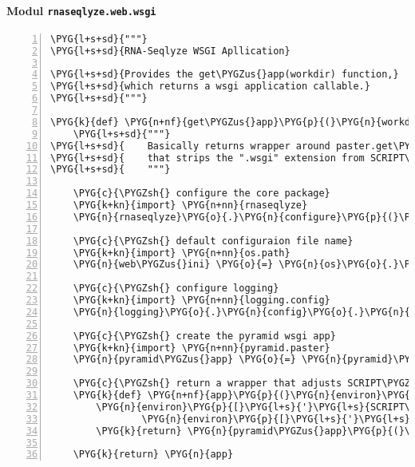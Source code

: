 \paragraph{Modul \texttt{rnaseqlyze.web.wsgi}}
\label{rnaseqlyze-pdf:modul-rnaseqlyze-web-wsgi}
\begin{Verbatim}[commandchars=\\\{\},numbers=left,firstnumber=1,stepnumber=5]
\PYG{l+s+sd}{"""}
\PYG{l+s+sd}{RNA-Seqlyze WSGI Apllication}

\PYG{l+s+sd}{Provides the get\PYGZus{}app(workdir) function,}
\PYG{l+s+sd}{which returns a wsgi application callable.}
\PYG{l+s+sd}{"""}

\PYG{k}{def} \PYG{n+nf}{get\PYGZus{}app}\PYG{p}{(}\PYG{n}{workdir}\PYG{p}{)}\PYG{p}{:}
    \PYG{l+s+sd}{"""}
\PYG{l+s+sd}{    Basically returns wrapper around paster.get\PYGZus{}app}
\PYG{l+s+sd}{    that strips the ".wsgi" extension from SCRIPT\PYGZus{}NAME}
\PYG{l+s+sd}{    """}

    \PYG{c}{\PYGZsh{} configure the core package}
    \PYG{k+kn}{import} \PYG{n+nn}{rnaseqlyze}
    \PYG{n}{rnaseqlyze}\PYG{o}{.}\PYG{n}{configure}\PYG{p}{(}\PYG{n}{workdir}\PYG{p}{)}

    \PYG{c}{\PYGZsh{} default configuraion file name}
    \PYG{k+kn}{import} \PYG{n+nn}{os.path}
    \PYG{n}{web\PYGZus{}ini} \PYG{o}{=} \PYG{n}{os}\PYG{o}{.}\PYG{n}{path}\PYG{o}{.}\PYG{n}{join}\PYG{p}{(}\PYG{n}{workdir}\PYG{p}{,} \PYG{l+s}{'}\PYG{l+s}{web.ini}\PYG{l+s}{'}\PYG{p}{)}

    \PYG{c}{\PYGZsh{} configure logging}
    \PYG{k+kn}{import} \PYG{n+nn}{logging.config}
    \PYG{n}{logging}\PYG{o}{.}\PYG{n}{config}\PYG{o}{.}\PYG{n}{fileConfig}\PYG{p}{(}\PYG{n}{web\PYGZus{}ini}\PYG{p}{,} \PYG{n+nb}{dict}\PYG{p}{(}\PYG{n}{here}\PYG{o}{=}\PYG{n}{workdir}\PYG{p}{)}\PYG{p}{)}

    \PYG{c}{\PYGZsh{} create the pyramid wsgi app}
    \PYG{k+kn}{import} \PYG{n+nn}{pyramid.paster}
    \PYG{n}{pyramid\PYGZus{}app} \PYG{o}{=} \PYG{n}{pyramid}\PYG{o}{.}\PYG{n}{paster}\PYG{o}{.}\PYG{n}{get\PYGZus{}app}\PYG{p}{(}\PYG{n}{web\PYGZus{}ini}\PYG{p}{,} \PYG{l+s}{'}\PYG{l+s}{main}\PYG{l+s}{'}\PYG{p}{)}

    \PYG{c}{\PYGZsh{} return a wrapper that adjusts SCRIPT\PYGZus{}NAME}
    \PYG{k}{def} \PYG{n+nf}{app}\PYG{p}{(}\PYG{n}{environ}\PYG{p}{,} \PYG{n}{start\PYGZus{}request}\PYG{p}{)}\PYG{p}{:}
        \PYG{n}{environ}\PYG{p}{[}\PYG{l+s}{'}\PYG{l+s}{SCRIPT\PYGZus{}NAME}\PYG{l+s}{'}\PYG{p}{]} \PYG{o}{=} \PYGZbs{}
                \PYG{n}{environ}\PYG{p}{[}\PYG{l+s}{'}\PYG{l+s}{SCRIPT\PYGZus{}NAME}\PYG{l+s}{'}\PYG{p}{]}\PYG{p}{[}\PYG{p}{:}\PYG{o}{-}\PYG{l+m+mi}{5}\PYG{p}{]}
        \PYG{k}{return} \PYG{n}{pyramid\PYGZus{}app}\PYG{p}{(}\PYG{n}{environ}\PYG{p}{,} \PYG{n}{start\PYGZus{}request}\PYG{p}{)}

    \PYG{k}{return} \PYG{n}{app}
\end{Verbatim}


